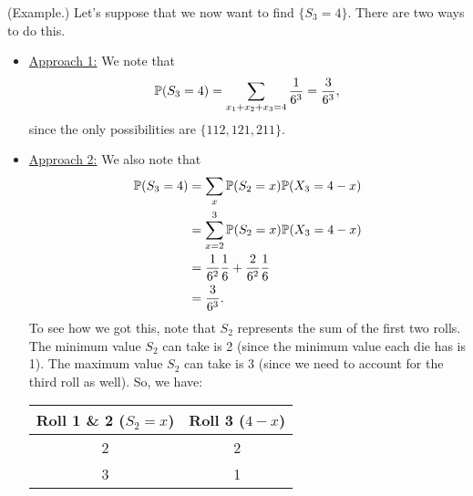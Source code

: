 \begin{mdframed}[]
    (Example.) Let's suppose that we now want to find $\{S_3 = 4\}$. There are two ways to do this.
    \begin{itemize}
        \item \underline{Approach 1:} We note that 
        \[\mathbb{P}(S_3 = 4) = \sum_{x_1 + x_2 + x_3 = 4} \frac{1}{6^3} = \frac{3}{6^3},\]
        since the only possibilities are $\{112, 121, 211\}$.

        \item \underline{Approach 2:} We also note that 
        \begin{equation*}
            \begin{aligned}
                \mathbb{P}(S_3 = 4) &= \sum_{x} \mathbb{P}(S_2 = x) \mathbb{P}(X_3 = 4 - x) \\ 
                    &= \sum_{x = 2}^{3} \mathbb{P}(S_2 = x) \mathbb{P}(X_3 = 4 - x) \\ 
                    &= \frac{1}{6^2} \frac{1}{6} + \frac{2}{6^2} \frac{1}{6} \\ 
                    &= \frac{3}{6^3}.
            \end{aligned}
        \end{equation*}
        To see how we got this, note that $S_2$ represents the sum of the first two rolls. The minimum value $S_2$ can take is 2 (since the minimum value each die has is 1). The maximum value $S_2$ can take is 3 (since we need to account for the third roll as well). So, we have: 
        \begin{center}
            \begin{tabular}{||c|c||}
                \hline 
                Roll 1 \& 2 ($S_2 = x$) & Roll 3 ($4 - x$) \\ 
                \hline \hline 
                2 & 2 \\ 
                3 & 1 \\ 
                \hline 
            \end{tabular}
        \end{center}
    \end{itemize}
\end{mdframed}

